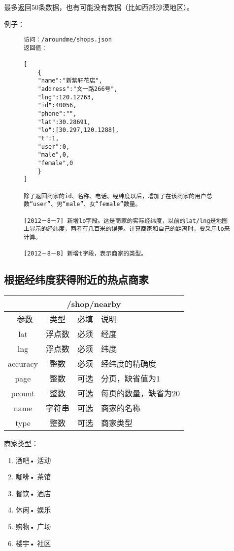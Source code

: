 \documentclass[cs4size]{ctexartutf8}
\begin{document}
最多返回50条数据，也有可能没有数据（比如西部沙漠地区）。

例子：

\begin{figure}[H]
\begin{verbatim}
访问：/aroundme/shops.json
返回值：

[
	{
	"name":"新紫轩花店",
	"address":"文一路266号",
	"lng":120.12763,
	"id":40056,
	"phone":"",
	"lat":30.28691,
	"lo":[30.297,120.1288],
	"t":1,
	"user":0,
	"male",0,
	"female",0
	}
]

除了返回商家的id、名称、电话、经纬度以后，增加了在该商家的用户总数“user”、男“male”、女“female”数量。

[2012－8－7] 新增lo字段。这是商家的实际经纬度，以前的lat/lng是地图上显示的经纬度，两者有几百米的误差。计算商家和自己的距离时，要采用lo来计算。

[2012－8－8] 新增t字段，表示商家的类型。

\end{verbatim}
\end{figure}



\subsection{根据经纬度获得附近的热点商家}

\begin{table}[H]
   \begin{center}
\begin{tabular}{|c|c|c|p{12cm}|}
\hline
\multicolumn{4}{|c|}{/shop/nearby} \\
\hline\hline
 \  参数  & 类型 & 必填 &  说明  \\
\hline
 lat  & 浮点数 & 必须 & 经度\\
\hline
 lng  &  浮点数 & 必须 & 纬度\\ 
\hline
 accuracy  & 整数 & 必须 & 经纬度的精确度\\ 
 \hline
 page  & 整数 & 可选 & 分页，缺省值为1\\ 
 \hline
 pcount  & 整数 & 可选 & 每页的数量，缺省为20\\ 
  \hline
 name  & 字符串 & 可选 & 商家的名称\\ 
  \hline
 type  & 整数 & 可选 & 商家类型\\  
\hline
\end{tabular}
   \end{center}
\end{table}

商家类型：
\begin{enumerate}
\item 酒吧• 活动
\item 咖啡• 茶馆   
\item 餐饮• 酒店
\item 休闲• 娱乐
\item 购物• 广场
\item 楼宇• 社区
\end{enumerate}
\end{document}
